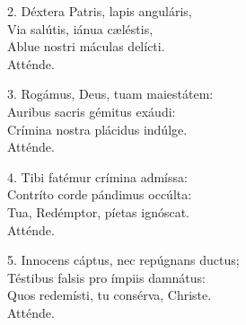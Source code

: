 \begin{multicols}{2}
\setlength{\parskip}{0.5em}
	2. Déxtera Patris, lapis anguláris,\\
	Via salútis, iánua c\ae{}léstis,\\
	Ablue nostri máculas delícti.\\
	\R Atténde.

	3. Rogámus, Deus, tuam maiestátem:\\
	Auribus sacris gémitus exáudi:\\
	Crímina nostra plácidus indúlge.\\
	\R Atténde.

	4. Tibi fatémur crímina admíssa:\\
	Contríto corde pándimus occúlta:\\
	Tua, Redémptor, píetas ignóscat.\\
	\R Atténde.

	5. Innocens cáptus, nec repúgnans ductus;\\
	Téstibus falsis pro ímpiis damnátus:\\
	Quos redemísti, tu consérva, Christe.\\
	\R Atténde.
\end{multicols}
